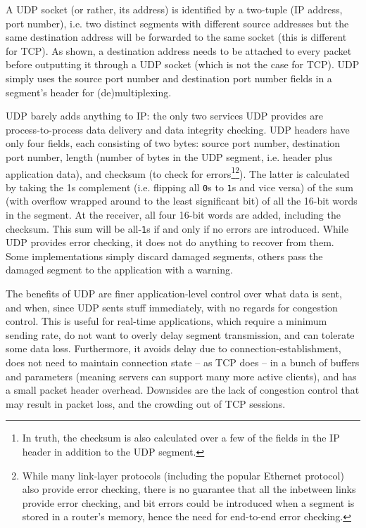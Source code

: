 \documentclass[table, xcdraw]{article}%
\begin{document}
A UDP socket (or rather, its address) is identified by a two-tuple (IP address, port number), i.e. two distinct segments with different source addresses but the same destination address will be forwarded to the same socket (this is different for TCP). As shown, a destination address needs to be attached to every packet before outputting it through a UDP socket (which is not the case for TCP). UDP simply uses the source port number and destination port number fields in a segment's header for (de)multiplexing.

UDP barely adds anything to IP: the only two services UDP provides are process-to-process data delivery and data integrity checking. UDP headers have only four fields, each consisting of two bytes: source port number, destination port number, length (number of bytes in the UDP segment, i.e. header plus application data), and checksum (to check for errors\footnote{In truth, the checksum is also calculated over a few of the fields in the IP header in addition to the UDP segment.}\footnote{While many link-layer protocols (including the popular Ethernet protocol) also provide error checking, there is no guarantee that all the inbetween links provide error checking, and bit errors could be introduced when a segment is stored in a router’s memory, hence the need for end-to-end error checking.}). The latter is calculated by taking the 1s complement (i.e. flipping all \texttt{0}s to \texttt{1}s and vice versa) of the sum (with overflow wrapped around to the least significant bit) of all the 16-bit words in the segment. At the receiver, all four 16-bit words are added, including the checksum. This sum will be all-\texttt{1}s if and only if no errors are introduced. While UDP provides error checking, it does not do anything to recover from them. Some implementations simply discard damaged segments, others pass the damaged segment to the application with a warning.

The benefits of UDP are finer application-level control over what data is sent, and when, since UDP sents stuff immediately, with no regards for congestion control. This is useful for real-time applications, which require a minimum sending rate, do not want to overly delay segment transmission, and can tolerate some data loss. Furthermore, it avoids delay due to connection-establishment, does not need to maintain connection state -- as TCP does -- in a bunch of buffers and parameters (meaning servers can support many more active clients), and has a small packet header overhead. Downsides are the lack of congestion control that may result in packet loss, and the crowding out of TCP sessions.
\end{document}
